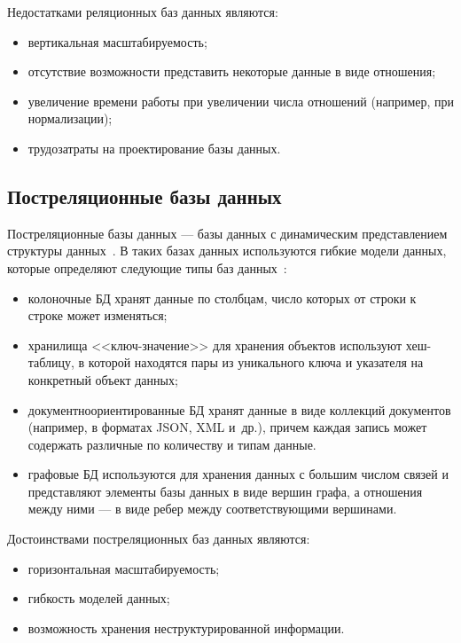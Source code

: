 Недостатками реляционных баз данных являются:
\begin{itemize}
    \item вертикальная масштабируемость;
    \item отсутствие возможности представить некоторые данные в виде отношения;
    \item увеличение времени работы при увеличении числа отношений (например,
        при нормализации);
    \item трудозатраты на проектирование базы данных.
\end{itemize}

\subsection{Постреляционные базы данных}

Постреляционные базы данных --- базы данных с динамическим представлением
структуры данных~\cite{art04}. В таких базах данных используются гибкие модели
данных, которые определяют следующие типы баз данных~\cite{art05}:
\begin{itemize}
    \item колоночные БД хранят данные по столбцам, число которых от строки к
        строке может изменяться;
    \item хранилища <<ключ-значение>> для хранения объектов используют
        хеш-таблицу, в которой находятся пары из уникального ключа и
        указателя на конкретный объект данных;
    \item документноориентированные БД хранят данные в виде коллекций
        документов (например, в форматах JSON, XML и~др.), причем каждая
        запись может содержать различные по количеству и типам данные.
    \item графовые БД используются для хранения данных с большим числом
        связей и представляют элементы базы данных в виде вершин графа, а
        отношения между ними --- в виде ребер между соответствующими
        вершинами.
\end{itemize}

Достоинствами постреляционных баз данных являются:
\begin{itemize}
    \item горизонтальная масштабируемость;
    \item гибкость моделей данных;
    \item возможность хранения неструктурированной информации.
\end{itemize}

